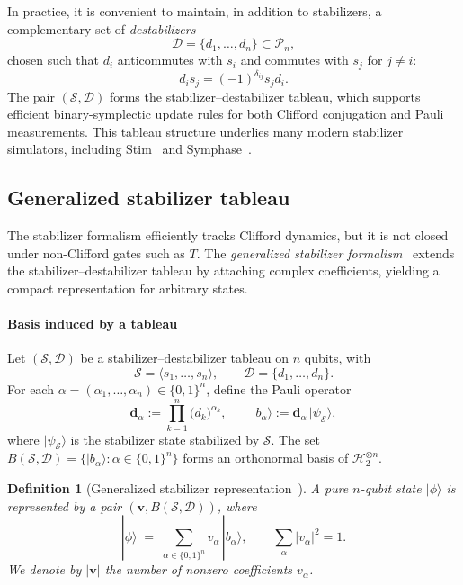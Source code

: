 \documentclass[10pt,conference]{IEEEtran}
\newtheorem{definition}{Definition}
\begin{document}
In practice, it is convenient to maintain, in addition to stabilizers, a complementary set of \emph{destabilizers}~\cite{aaronson2004improved}
\[
\mathcal{D}=\{d_1,\dots,d_n\}\subset \mathcal{P}_n,
\]
chosen such that $d_i$ anticommutes with $s_i$ and commutes with $s_j$ for $j\neq i$:
\[
d_i s_j = (-1)^{\delta_{ij}} s_j d_i.
\]
The pair $(\mathcal{S},\mathcal{D})$ forms the stabilizer--destabilizer tableau, which supports efficient binary-symplectic update rules for both Clifford conjugation and Pauli measurements. 
This tableau structure underlies many modern stabilizer simulators, including Stim~\cite{gidney2021stim} and Symphase~\cite{fang2024symphase}.

\subsection{Generalized stabilizer tableau}
\label{subsec:gs_tableau}

The stabilizer formalism efficiently tracks Clifford dynamics, but it is not closed under non-Clifford gates such as $T$.
The \emph{generalized stabilizer formalism}~\cite{yoder2012generalization} extends the stabilizer--destabilizer tableau by attaching complex coefficients, yielding a compact representation for arbitrary states.

\paragraph{Basis induced by a tableau}
Let $(\mathcal{S},\mathcal{D})$ be a stabilizer--destabilizer tableau on $n$ qubits, with
\[
\mathcal{S}=\langle s_{1},\dots,s_{n}\rangle,\qquad
\mathcal{D}=\{d_{1},\dots,d_{n}\}.
\]
For each $\alpha=(\alpha_1,\dots,\alpha_n)\in\{0,1\}^n$, define the Pauli operator
\[
\mathbf{d}_\alpha := \prod_{k=1}^n \bigl(d_k\bigr)^{\alpha_k},
\qquad
|b_\alpha\rangle := \mathbf{d}_\alpha\,|\psi_{\mathcal{S}}\rangle,
\]
where $|\psi_{\mathcal{S}}\rangle$ is the stabilizer state stabilized by $\mathcal{S}$.
The set $B(\mathcal{S},\mathcal{D})=\{|b_\alpha\rangle:\alpha\in\{0,1\}^n\}$ forms an orthonormal basis of $\mathcal{H}_2^{\otimes n}$.

\begin{definition}[Generalized stabilizer representation~\cite{yoder2012generalization}]
\label{def:gsf}
A pure $n$-qubit state $|\phi\rangle$ is represented by a pair $(\mathbf{v},B(\mathcal{S},\mathcal{D}))$, where
\begin{equation}
\label{eq:gsf_pure}
|\phi\rangle \;=\; \sum_{\alpha\in\{0,1\}^n} v_\alpha\,|b_\alpha\rangle,
\qquad
\sum_\alpha |v_\alpha|^2 = 1.
\end{equation}
We denote by $|\mathbf{v}|$ the number of nonzero coefficients $v_\alpha$.
\end{definition}
\end{document}
